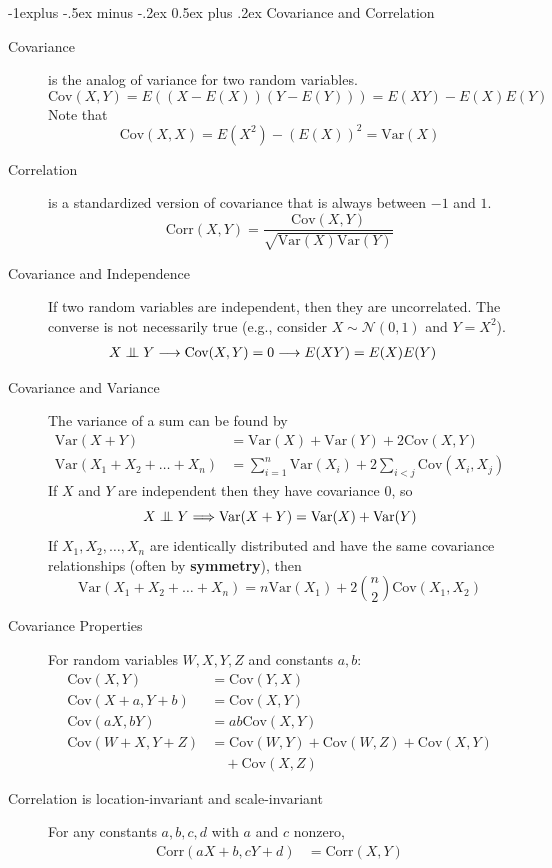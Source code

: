 \documentclass[6pt,landscape]{article}
\makeatletter
\newcommand\independent{\protect\mathpalette{\protect\independenT}{\perp}}
\def\independenT#1#2{\mathrel{\setbox0\hbox{$#1#2$}%
    \copy0\kern-\wd0\mkern4mu\box0}}
\newcommand{\var}{\textrm{Var}}
\newcommand{\cov}{\textrm{Cov}}
\newcommand{\corr}{\textrm{Corr}}
\renewcommand{\N}{\mathcal{N}}
\renewcommand{\subsection}{\@startsection{subsection}{2}{0mm}%
                                {-1explus -.5ex minus -.2ex}%
                                {0.5ex plus .2ex}%
                                {\normalfont\normalsize\bfseries}}
\makeatother
\begin{document}
\begin{multicols*}{3}
\subsection{Covariance and Correlation}
\begin{description}
\item [Covariance] is the analog of variance for two random variables.
    \[\cov(X, Y) = E\left((X - E(X))(Y - E(Y))\right) = E(XY) - E(X)E(Y)\]
    Note that 
    \[\cov(X, X) = E(X^2) - (E(X))^2 =  \var(X)\]
\item [Correlation] is a standardized version of covariance that is always between $-1$ and $1$.
    \[\corr(X, Y) = \frac{\cov(X, Y)}{\sqrt{\var(X)\var(Y)}} \]
\item [Covariance and Independence] If two random variables are independent, then they are uncorrelated. The converse is not necessarily true (e.g., consider $X \sim \N(0,1)$ and $Y=X^2$).
    \begin{align*}
    	X \independent Y &\longrightarrow \cov(X, Y) = 0 \longrightarrow E(XY) = E(X)E(Y)
    \end{align*}
\item [Covariance and Variance]  The variance of a sum can be found by
    \begin{align*}
        \var(X + Y) &= \var(X) + \var(Y) + 2\cov(X, Y) \\
        \var(X_1 + X_2 + \dots + X_n ) &= \sum_{i = 1}^{n}\var(X_i) + 2\sum_{i < j} \cov(X_i, X_j)
    \end{align*}
    If $X$ and $Y$ are independent then they have covariance $0$, so
    \[X \independent Y \Longrightarrow \var(X + Y) = \var(X) + \var(Y)\]
    If $X_1, X_2, \dots, X_n$ are identically distributed and have the same covariance relationships (often by \textbf{symmetry}), then 
    \[\var(X_1 + X_2 + \dots + X_n ) = n\var(X_1) + 2{n \choose 2}\cov(X_1, X_2)\]
\item [Covariance Properties]  For random variables $W, X, Y, Z$ and constants $a, b$:
    \begin{align*}
    	\cov(X, Y) &= \cov(Y, X) \\
        \cov(X + a, Y + b) &= \cov(X, Y) \\
        \cov(aX, bY) &= ab\cov(X, Y) \\
        \cov(W + X, Y + Z) &= \cov(W, Y) + \cov(W, Z) + \cov(X, Y)\\
        &\quad + \cov(X, Z)
    \end{align*}
\item [Correlation is location-invariant and scale-invariant] For any constants $a,b,c,d$ with $a$ and $c$ nonzero,
    \begin{align*}
        \corr(aX + b, cY + d) &= \corr(X, Y) 
    \end{align*}
\end{description}


\end{multicols*}
\end{document}
